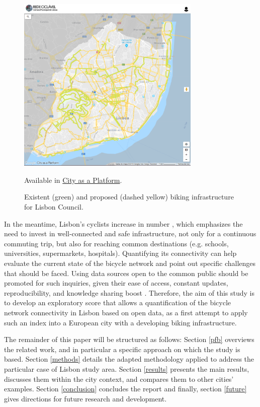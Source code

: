\documentclass[information,article,submit,moreauthors,pdftex,10pt,a4paper]{mdpi}
\theoremstyle{mdpi}
\newcounter{ex}
\newcounter{re}
\theoremstyle{mdpidefinition}
\begin{document}
\begin{figure}[ht]
	\begin{center}
		\includegraphics[height=8.5cm]{fig1}
		\caption{Existent (green) and proposed (dashed yellow) biking infrastructure for Lisbon Council.} Available in \protect\href{https://lisboa.city-platform.com/app/?a=redeciclavel}{City as a Platform}.
		\label{fig1}
	\end{center}
\end{figure}

In the meantime, Lisbon's cyclists increase in number \cite{Baratto2016}, which emphasizes the need to invest in well-connected and safe infrastructure, not only for a continuous commuting trip, but also for reaching common destinations (e.g. schools, universities, supermarkets, hospitals). Quantifying its connectivity can help evaluate the current state of the bicycle network and point out specific challenges that should be faced. Using data sources open to the common public should be promoted for such inquiries, given their ease of access, constant updates, reproducibility, and knowledge sharing boost \cite{opendatahandbook,EuropeanDataPortal2018}. Therefore, the aim of this study is to develop an exploratory score that allows a quantification of the bicycle network connectivity in Lisbon based on open data, as a first attempt to apply such an index into a European city with a developing biking infrastructure.

The remainder of this paper will be structured as follows: Section \ref{pfb} overviews the related work, and in particular a specific approach on which the study is based. Section \ref{methods} details the adapted methodology applied to address the particular case of Lisbon study area. Section \ref{results} presents the main results, discusses them within the city context, and compares them to other cities' examples. Section \ref{conclusion} concludes the report and finally, section \ref{future} gives directions for future research and development.
\end{document}
